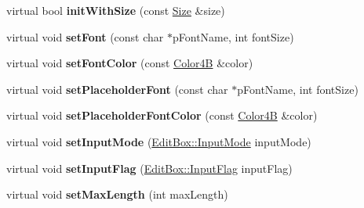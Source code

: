 \begin{DoxyCompactItemize}
\item 
\mbox{\label{classui_1_1EditBoxImplTizen_ab34721d38f0b3b7448cfa5296f165a8b}} 
virtual bool {\bfseries init\+With\+Size} (const \hyperlink{classSize}{Size} \&size)
\item 
\mbox{\label{classui_1_1EditBoxImplTizen_ac0b0ecf86c0f2cdb94cf10c44fa425d1}} 
virtual void {\bfseries set\+Font} (const char $\ast$p\+Font\+Name, int font\+Size)
\item 
\mbox{\label{classui_1_1EditBoxImplTizen_a59fcdcbc3737bf6c2a4a3392fe07cc6c}} 
virtual void {\bfseries set\+Font\+Color} (const \hyperlink{structColor4B}{Color4B} \&color)
\item 
\mbox{\label{classui_1_1EditBoxImplTizen_a55b441d748a7ef5e13513907f73540f9}} 
virtual void {\bfseries set\+Placeholder\+Font} (const char $\ast$p\+Font\+Name, int font\+Size)
\item 
\mbox{\label{classui_1_1EditBoxImplTizen_ae4b05420356d5f8fa9cd9af0a858a1a2}} 
virtual void {\bfseries set\+Placeholder\+Font\+Color} (const \hyperlink{structColor4B}{Color4B} \&color)
\item 
\mbox{\label{classui_1_1EditBoxImplTizen_a7d38de1a164870522761317f6dcaf3a8}} 
virtual void {\bfseries set\+Input\+Mode} (\hyperlink{classui_1_1EditBox_a7a1bfe8f3ba218bedfcf5451ec3ce01a}{Edit\+Box\+::\+Input\+Mode} input\+Mode)
\item 
\mbox{\label{classui_1_1EditBoxImplTizen_ae88fcd266e08d5fed9dc4993bf162b8a}} 
virtual void {\bfseries set\+Input\+Flag} (\hyperlink{classui_1_1EditBox_af02f13ee9fba51d59bb3111e200848c8}{Edit\+Box\+::\+Input\+Flag} input\+Flag)
\item 
\mbox{\label{classui_1_1EditBoxImplTizen_a30f3836aa1dbd86edfcb2eb59eea769d}} 
virtual void {\bfseries set\+Max\+Length} (int max\+Length)
\item 
\mbox{\label{classui_1_1EditBoxImplTizen_a294afc90f77839481a5ca5ba23ff4fa5}} 

\end{DoxyCompactItemize}
